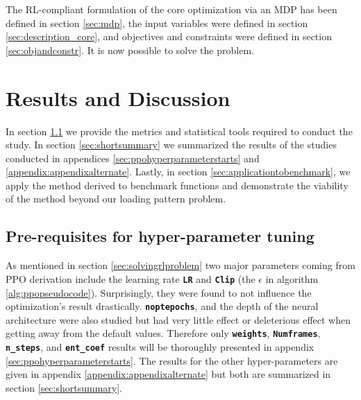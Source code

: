 \documentclass[a4paper]{article}
\newcommand{\code}[1]{\colorbox{light-gray}{\small\color{blue}\textbf{\texttt{#1}}}}
\begin{document}
The RL-compliant formulation of the core optimization via an MDP has been defined in section \ref{sec:mdp}, the input variables were defined in section \ref{sec:description_core}, and objectives and constraints were defined in section \ref{sec:objandconstr}. It is now possible to solve the problem. 

\section{Results and Discussion}
\label{sec:results}

In section  \ref{sec:prerequisite} we provide the metrics and statistical tools required to conduct the study. In section \ref{sec:shortsummary} we summarized the results of the studies conducted in appendices \ref{sec:ppohyperparameterstarts} and \ref{appendix:appendixalternate}. Lastly,  in section \ref{sec:applicationtobenchmark}, we apply the method derived to benchmark functions and demonstrate the viability of the method beyond our loading pattern problem.

 \subsection{Pre-requisites for hyper-parameter tuning}
 \label{sec:prerequisite}
 As mentioned in section \ref{sec:solvingrlproblem} two major parameters coming from PPO derivation include the learning rate \code{LR} and \code{Clip} (the $\epsilon$ in algorithm \ref{alg:ppopseudocode}). Surprisingly, they were found to not influence the optimization's result drastically. \code{noptepochs}, and the depth of the neural architecture were also studied but had very little effect or deleterious effect when getting away from the default values. Therefore only \code{weights}, \code{Numframes}, \code{n\_steps}, and \code{ent\_coef} results will be thoroughly presented in appendix \ref{sec:ppohyperparameterstarts}. The results for the other hyper-parameters are given in appendix \ref{appendix:appendixalternate} but both are summarized in section \ref{sec:shortsummary}. 
\end{document}
